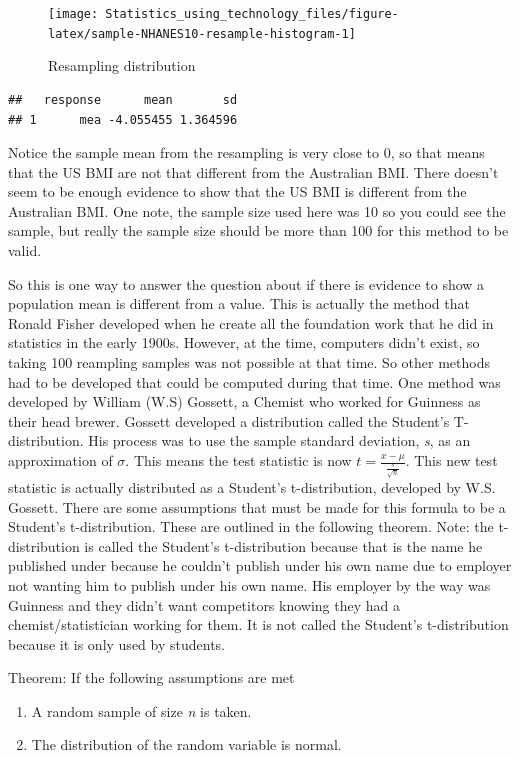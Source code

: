 \documentclass[
]{book}
\begin{document}
\begin{figure}
\texttt{[image: Statistics\_using\_technology\_files/figure-latex/sample-NHANES10-resample-histogram-1]} \caption{Resampling distribution}\label{fig:sample-NHANES10-resample-histogram}
\end{figure}

\begin{verbatim}
##   response      mean       sd
## 1      mea -4.055455 1.364596
\end{verbatim}

Notice the sample mean from the resampling is very close to 0, so that means that the US BMI are not that different from the Australian BMI. There doesn't seem to be enough evidence to show that the US BMI is different from the Australian BMI. One note, the sample size used here was 10 so you could see the sample, but really the sample size should be more than 100 for this method to be valid.

So this is one way to answer the question about if there is evidence to show a population mean is different from a value. This is actually the method that Ronald Fisher developed when he create all the foundation work that he did in statistics in the early 1900s. However, at the time, computers didn't exist, so taking 100 reampling samples was not possible at that time. So other methods had to be developed that could be computed during that time. One method was developed by William (W.S) Gossett, a Chemist who worked for Guinness as their head brewer. Gossett developed a distribution called the Student's T-distribution. His process was to use the sample standard deviation, \emph{s}, as an approximation of \(\sigma\). This means the test statistic is now \(t=\frac{x-\mu}{\frac{s}{\sqrt{n}}}\). This new test statistic is actually distributed as a Student's t-distribution, developed by W.S. Gossett. There are some assumptions that must be made for this formula to be a Student's t-distribution. These are outlined in the following theorem. Note: the t-distribution is called the Student's t-distribution because that is the name he published under because he couldn't publish under his own name due to employer not wanting him to publish under his own name. His employer by the way was Guinness and they didn't want competitors knowing they had a chemist/statistician working for them. It is not called the Student's t-distribution because it is only used by students.

Theorem: If the following assumptions are met

\begin{enumerate}
\def\labelenumi{\alph{enumi}.}
\item
  A random sample of size \emph{n} is taken.
\item
  The distribution of the random variable is normal.
\end{enumerate}
\end{document}
